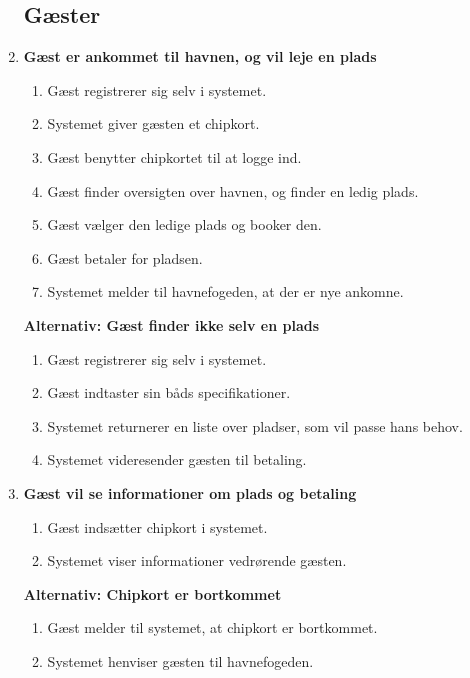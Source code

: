 \begin{enumerate}
\subsection{Gæster}

    \item{\textbf{Gæst er ankommet til havnen, og vil leje en plads}}
      \begin{enumerate}
        \item Gæst registrerer sig selv i systemet.
        \item Systemet giver gæsten et chipkort.
        \item Gæst benytter chipkortet til at logge ind.
        \item Gæst finder oversigten over havnen, og finder en ledig plads.
        \item Gæst vælger den ledige plads og booker den.
        \item Gæst betaler for pladsen.
        \item Systemet melder til havnefogeden, at der er nye ankomne.
      \end{enumerate}

    \textbf{Alternativ: Gæst finder ikke selv en plads}
      \begin{enumerate}
        \item Gæst registrerer sig selv i systemet.
        \item Gæst indtaster sin båds specifikationer.
        \item Systemet returnerer en liste over pladser, som vil passe hans behov.
        \item Systemet videresender gæsten til betaling.
      \end{enumerate}

    \item{\textbf{Gæst vil se informationer om plads og betaling}}
      \begin{enumerate}
        \item Gæst indsætter chipkort i systemet.
        \item Systemet viser informationer vedrørende gæsten.
      \end{enumerate}

    \textbf{Alternativ: Chipkort er bortkommet}
      \begin{enumerate}
        \item Gæst melder til systemet, at chipkort er bortkommet.
        \item Systemet henviser gæsten til havnefogeden.
      \end{enumerate}


\end{enumerate}
